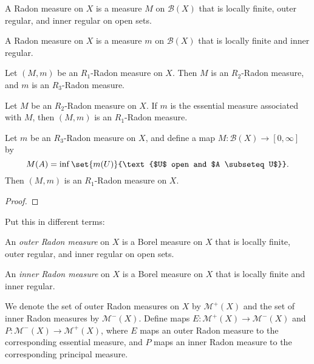 \documentclass[article, a4paper, 11pt, oneside]{memoir}
\numberwithin{equation}{chapter}
\newcommand{\calB}{\mathcal{B}}
\newcommand{\borel}[1]{\calB(#1)}
\begin{document}
\begin{definition}
    A Radon measure on $X$ is a measure $M$ on $\borel{X}$ that is locally finite, outer regular, and inner regular on open sets.
\end{definition}

\begin{definition}
    A Radon measure on $X$ is a measure $m$ on $\borel{X}$ that is locally finite and inner regular.
\end{definition}


\begin{theorem}
    \begin{enumthm}
        \item Let $(M,m)$ be an $R_1$-Radon measure on $X$. Then $M$ is an $R_2$-Radon measure, and $m$ is an $R_3$-Radon measure.

        \item Let $M$ be an $R_2$-Radon measure on $X$. If $m$ is the essential measure associated with $M$, then $(M,m)$ is an $R_1$-Radon measure.

        \item Let $m$ be an $R_3$-Radon measure on $X$, and define a map $M \colon \borel{X} \to [0,\infty]$ by
        \begin{equation*}
            M(A)
                = \inf \set{m(U)}{\text{$U$ open and $A \subseteq U$}}.
        \end{equation*}
        Then $(M,m)$ is an $R_1$-Radon measure on $X$.
    \end{enumthm}
\end{theorem}

\begin{proof}
    
\end{proof}

\newcommand{\calM}{\mathcal{M}}
\newcommand{\radonout}{\calM^{+}}
\newcommand{\radonin}{\calM^{-}}

Put this in different terms:

\begin{definition}
    An \emph{outer Radon measure} on $X$ is a Borel measure on $X$ that is locally finite, outer regular, and inner regular on open sets.

    An \emph{inner Radon measure} on $X$ is a Borel measure on $X$ that is locally finite and inner regular.
\end{definition}
%
We denote the set of outer Radon measures on $X$ by $\radonout(X)$ and the set of inner Radon measures by $\radonin(X)$. Define maps $E \colon \radonout(X) \to \radonin(X)$ and $P \colon \radonin(X) \to \radonout(X)$, where $E$ maps an outer Radon measure to the corresponding essential measure, and $P$ maps an inner Radon measure to the corresponding principal measure.
\end{document}
